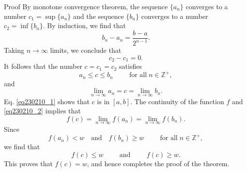\begin{example}
\begin{myproof}{Proof}
By monotone convergence theorem, the sequence $\{a_n\}$ converges to a number $c_1=\sup\{a_n\}$ and the sequence $\{b_n\}$ converges to a number $c_2=\inf\{b_n\}$. By induction, we find that
\[b_n-a_n=\frac{b-a}{2^{n-1}}.\]Taking $n\rightarrow \infty$ limits, we conclude that
\[c_2-c_1=0.\]\bp
It follows that the number   $c=c_1=c_2$   satisfies
\begin{equation}\label{eq230210_1}a_n\leq c\leq b_n\hspace{1cm}\text{for all}\;n\in\mathbb{Z}^+,\end{equation}and 
\begin{equation}\label{eq230210_2}\lim_{n\rightarrow\infty}a_n=c=\lim_{n\rightarrow\infty}b_n.\end{equation}
Eq. \eqref{eq230210_1} shows that $c$ is in $[a,b]$. The continuity of the function $f$ and \eqref{eq230210_2} implies that
\[f(c)=\lim_{n\rightarrow \infty}f(a_n)=\lim_{n\rightarrow\infty}f(b_n).\]
Since \[f(a_n)<w \quad\text{and}\quad f(b_n)\geq w\hspace{1cm}\text{for all}\; n\in\mathbb{Z}^+,\]
we find that
\[f(c)\leq w\hspace{1cm}\text{and}\hspace{1cm}f(c)\geq w.\]
This proves that $f(c)=w$, and hence completes the proof of the theorem.


\end{myproof}



\end{example}
